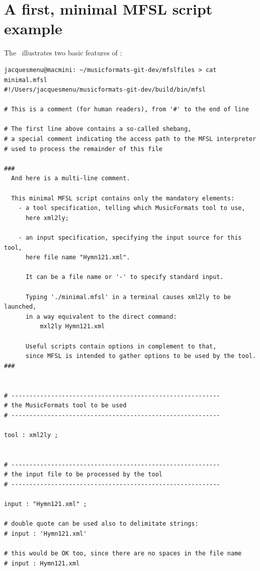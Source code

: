 \section{A first, minimal MFSL script example}

The  \script\ illustrates two basic features of \mfslLang:
\begin{lstlisting}[language=MFSL]
jacquesmenu@macmini: ~/musicformats-git-dev/mfslfiles > cat minimal.mfsl
#!/Users/jacquesmenu/musicformats-git-dev/build/bin/mfsl

# This is a comment (for human readers), from '#' to the end of line

# The first line above contains a so-called shebang,
# a special comment indicating the access path to the MFSL interpreter
# used to process the remainder of this file

###
  And here is a multi-line comment.

  This minimal MFSL script contains only the mandatory elements:
    - a tool specification, telling which MusicFormats tool to use,
      here xml2ly;

    - an input specification, specifying the input source for this tool,
      here file name "Hymn121.xml".

      It can be a file name or '-' to specify standard input.

      Typing './minimal.mfsl' in a terminal causes xml2ly to be launched,
      in a way equivalent to the direct command:
          mxl2ly Hymn121.xml

      Useful scripts contain options in complement to that,
      since MFSL is intended to gather options to be used by the tool.
###


# ----------------------------------------------------------
# the MusicFormats tool to be used
# ----------------------------------------------------------

tool : xml2ly ;


# ----------------------------------------------------------
# the input file to be processed by the tool
# ----------------------------------------------------------

input : "Hymn121.xml" ;

# double quote can be used also to delimitate strings:
# input : 'Hymn121.xml'

# this would be OK too, since there are no spaces in the file name
# input : Hymn121.xml
\end{lstlisting}


